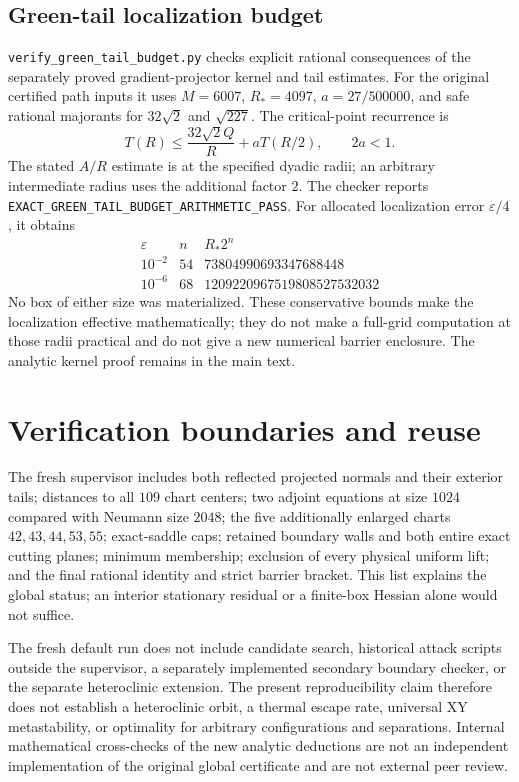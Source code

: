 \documentclass[10pt]{article}
\newcommand{\code}[1]{\nolinkurl{#1}}
\begin{document}
\subsection*{Green-tail localization budget}
\code{verify_green_tail_budget.py} checks explicit rational consequences
of the separately proved gradient-projector kernel and tail estimates.
For the original certified path inputs it uses $M=6007$, $R_*=4097$,
$a=27/500000$, and safe rational majorants for $32\sqrt2$ and
$\sqrt{227}$. The critical-point recurrence is
\[
 T(R)\le\frac{32\sqrt2 Q}{R}+aT(R/2),\qquad 2a<1.
\]
The stated $A/R$ estimate is at the specified dyadic radii; an arbitrary
intermediate radius uses the additional factor $2$. The checker reports
\code{EXACT_GREEN_TAIL_BUDGET_ARITHMETIC_PASS}. For allocated localization
error $\varepsilon/4$, it obtains
\[
\begin{array}{c|c|r}
\varepsilon&n& R_*2^n\\ \hline
10^{-2}&54&73804990693347688448\\
10^{-6}&68&1209220967519808527532032
\end{array}
\]
No box of either size was materialized. These conservative bounds make
the localization effective mathematically; they do not make a full-grid
computation at those radii practical and do not give a new numerical
barrier enclosure. The analytic kernel proof remains in the main text.

\clearpage
\section{Verification boundaries and reuse}

The fresh supervisor includes both reflected projected normals and their
exterior tails; distances to all $109$ chart centers; two adjoint equations
at size $1024$ compared with Neumann size $2048$; the five additionally
enlarged charts $42,43,44,53,55$; exact-saddle caps; retained boundary
walls and both entire exact cutting planes; minimum membership; exclusion
of every physical uniform lift; and the final rational identity and strict
barrier bracket. This list explains the global status; an interior
stationary residual or a finite-box Hessian alone would not suffice.

The fresh default run does not include candidate search, historical attack
scripts outside the supervisor, a separately implemented secondary boundary
checker, or the separate heteroclinic extension. The present reproducibility
claim therefore does not establish a heteroclinic orbit, a thermal escape
rate, universal XY metastability, or optimality for arbitrary configurations
and separations. Internal mathematical cross-checks of the new analytic
deductions are not an independent implementation of the original global
certificate and are not external peer review.
\end{document}
